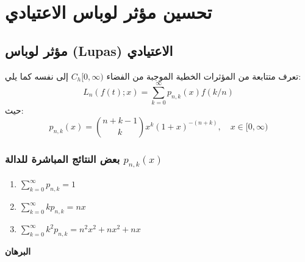 \chapter{تحسين مؤثر لوباس الاعتيادي}
\section{مؤثر لوباس (Lupas) الاعتيادي}

تعرف متتابعة من المؤثرات الخطية الموجبة من الفضاء $C_h[0, \infty)$ إلى نفسه كما يلي:
\[
L_n(f(t); x) = \sum_{k=0}^{\infty} p_{n,k} (x) f(k/n)
\]
حيث:
\[
p_{n,k} (x) = \binom{n+k-1}{k} x^k (1+x)^{-(n+k)}, \quad x \in [0, \infty)
\]

\subsection*{بعض النتائج المباشرة للدالة $p_{n,k}(x)$}
\begin{english}
	\begin{enumerate}[label=\arabic*)]
		\item $\sum_{k=0}^{\infty} p_{n,k} = 1$
		\item $\sum_{k=0}^{\infty}k p_{n,k} = nx$
		\item $\sum_{k=0}^{\infty}k^2 p_{n,k} = n^2 x^2 + nx^2 + nx$
	\end{enumerate}
\end{english}
\noindent
\textbf{البرهان}

